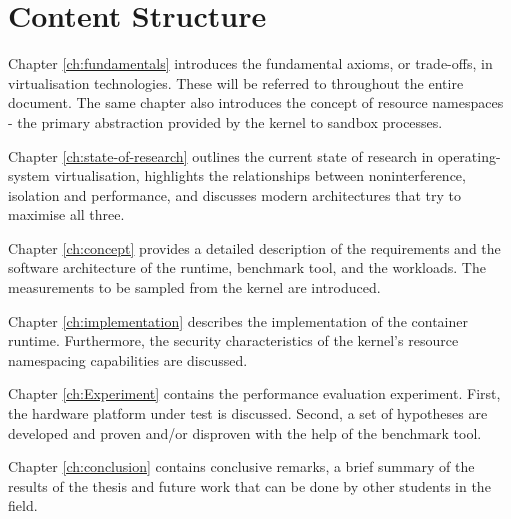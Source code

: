 \section{Content Structure}
Chapter \ref{ch:fundamentals} introduces the fundamental axioms, or trade-offs, in virtualisation technologies.
These will be referred to throughout the entire document. 
The same chapter also introduces the concept of resource namespaces - the primary abstraction 
provided by the kernel to sandbox processes.

Chapter \ref{ch:state-of-research} outlines the current state of research in operating-system 
virtualisation, highlights the relationships between noninterference, isolation and performance, and
discusses modern architectures that try to maximise all three.     

Chapter \ref{ch:concept} provides a detailed description of the requirements and the software architecture 
of the runtime, benchmark tool, and the workloads. The measurements to be sampled from the kernel are introduced.

Chapter \ref{ch:implementation} describes the implementation of the container runtime. Furthermore,
the security characteristics of the kernel's resource namespacing capabilities are discussed.

Chapter \ref{ch:Experiment} contains the performance evaluation experiment. First, the hardware 
platform under test is discussed. Second, a set of hypotheses are developed and proven and/or 
disproven with the help of the benchmark tool.  

Chapter \ref{ch:conclusion} contains conclusive remarks, a brief summary of the results of the thesis
and future work that can be done by other students in the field. 